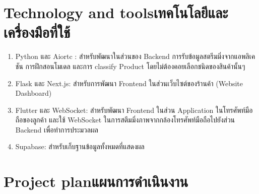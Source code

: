 \section{\ifenglish Technology and tools\else เทคโนโลยีและเครื่องมือที่ใช้\fi}
\begin{enumerate}
    \item Python และ Aiortc : สำหรับพัฒนาในส่วนของ Backend การรับข้อมูลสตรีมมิ่งจากแอพลิเคชัน การฝึกสอนโมเดล และการ classify Product
          โดยไม่ต้องคอยเลือกชนิดของสินค้านั้นๆ
    \item Flask และ Next.js: สําหรับการพัฒนา Frontend ในส่วนเว็บไซต์ของร้านค้า (Website Dashboard)
    \item Flutter และ WebSocket: สำหรับพัฒนา Frontend  ในส่วน Application ในโทรศัพท์มือถือของลูกค้า และใช้ WebSocket ในการสตีมมิ่งภาพจากกล้องโทรศัพท์มือถือไปยังส่วน Backend เพื่อทำการประมวลผล
    \item Supabase: สําหรับเก็บฐานข้อมูลทั้งหมดที่แสดงผล

\end{enumerate}



\section{\ifenglish Project plan\else แผนการดำเนินงาน\fi}
%  

